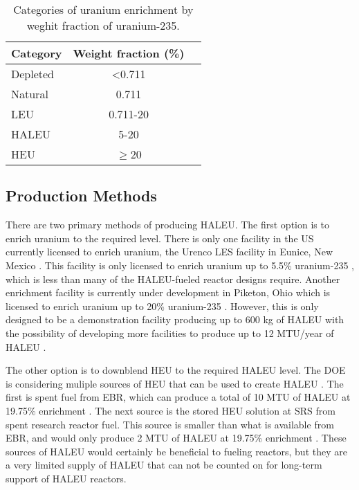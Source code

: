 \begin{table}
    \centering
    \caption{Categories of uranium enrichment by weghit fraction of 
    uranium-235.}
    \label{tab:enrichemnt}
    \begin{tabular}{l c c}
        \hline
        Category & Weight fraction (\%)\\\hline
        Depleted & <0.711 \\
        Natural & 0.711 \\
        \gls{LEU} & 0.711-20 \\
        \gls{HALEU} & 5-20 \\
        \gls{HEU} & $\ge$20 \\
        \hline
    \end{tabular}
\end{table}

\subsection{Production Methods}
There are two primary methods of producing \gls{HALEU}. The first 
option is to enrich uranium to the required level. There is only one 
facility in the US currently 
licensed to enrich uranium, the Urenco LES facility in Eunice, 
New Mexico \cite{noauthor_establishing_2022}. This facility is only 
licensed to enrich uranium up to 5.5\% uranium-235 \cite{noauthor_establishing_2022},
which is less than many of the \gls{HALEU}-fueled reactor designs 
require. Another enrichment facility is currently under development in 
Piketon, Ohio which is licensed to enrich uranium up to 20\% 
uranium-235 \cite{noauthor_establishing_2022}. However, this is only 
designed to be a demonstration facility producing up to 600 kg of 
\gls{HALEU} \cite{us_nrc_centrus_2021} with the possibility of 
developing more facilities to produce up to 12 MTU/year of \gls{HALEU}
\cite{noauthor_establishing_2022}.

The other option is to downblend \gls{HEU} to the required \gls{HALEU}
level. The \gls{DOE} is considering muliple sources of \gls{HEU} that can 
be used to create \gls{HALEU} \cite{noauthor_establishing_2022}. The 
first is spent fuel from \gls{EBR}, which can produce a total of 10 MTU 
of \gls{HALEU} at 19.75\% enrichment \cite{noauthor_establishing_2022}. 
The next source is the stored \gls{HEU} solution at \gls{SRS} from 
spent research reactor fuel. This source is smaller than what is 
available from \gls{EBR}, and would only produce 2 MTU of \gls{HALEU} 
at 19.75\% enrichment \cite{noauthor_establishing_2022}. These sources of 
\gls{HALEU} would certainly be beneficial to fueling reactors, but they 
are a very limited supply of \gls{HALEU} that can not be counted on 
for long-term support of \gls{HALEU} reactors. 


